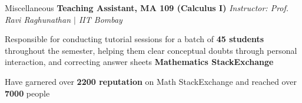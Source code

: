 \begin{rubric}{Miscellaneous}
    \entry*[2020] \textbf{Teaching Assistant, MA 109 (Calculus I)} \hfill \emph{Instructor: Prof. Ravi Raghunathan $\mid$ IIT Bombay}
	    
	    Responsible for conducting tutorial sessions for a batch of \textbf{45 students} throughout the semester, helping them clear conceptual doubts through personal interaction, and correcting answer sheets
	\entry* \textbf{Mathematics StackExchange}

		Have garnered over \textbf{2200 reputation} on Math StackExchange and reached over \textbf{7000} people
\end{rubric}